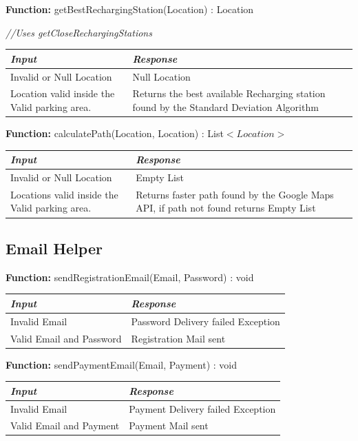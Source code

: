 \documentclass[a4paper]{article}
\begin{document}
\textbf{Function:} getBestRechargingStation(Location) : Location  \par
\textit{//Uses getCloseRechargingStations}
\begin{center}
\begin{tabular}{ | L{7cm} | L{5cm} | }
\hline
	\textit{Input}& \textit{Response}\\ \hline
	Invalid or Null Location & Null Location \\ \hline
	Location valid inside the Valid parking area. & Returns the best available Recharging station found by the Standard Deviation Algorithm  \\ \hline
\end{tabular}
\end{center}

\textbf{Function:} calculatePath(Location, Location) : List\(<Location>\)
\begin{center}
\begin{tabular}{ | L{6cm} | L{6cm} | }
\hline
	\textit{Input}& \textit{Response}\\ \hline
	Invalid or Null Location & Empty List \\ \hline
	Locations valid inside the Valid parking area. & Returns faster path found by the Google Maps API, if path not found returns Empty List \\ \hline
\end{tabular}
\end{center}

\subsection{Email Helper}
\textbf{Function:} sendRegistrationEmail(Email, Password) : void
\begin{center}
\begin{tabular}{ | L{6cm} | L{6cm} | }
\hline
	\textit{Input}& \textit{Response}\\ \hline
	Invalid Email & Password Delivery failed Exception \\ \hline
	Valid Email and Password & Registration Mail sent \\ \hline
\end{tabular}
\end{center}
\textbf{Function:} sendPaymentEmail(Email, Payment) : void
\begin{center}
\begin{tabular}{ | L{6cm} | L{6cm} | }
\hline
	\textit{Input}& \textit{Response}\\ \hline
	Invalid Email & Payment Delivery failed Exception \\ \hline
	Valid Email and Payment & Payment Mail sent \\ \hline
\end{tabular}
\end{center}
\end{document}
